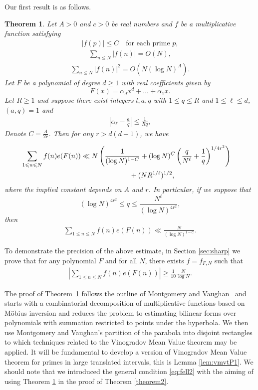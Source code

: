 \documentclass[12pt]{amsart}
\newtheorem{theorem}{Theorem}
\def\\{\cr}
\def\le{\leqslant}
\def\ge{\geqslant}
\begin{document}
Our first result is as follows.
\begin{theorem}
\label{theo:main}
Let $A>0$ and $c>0$ be real numbers and $f$ be a multiplicative function satisfying 
\begin{align}
\label{eq:fprime}
|f(p)| \le C \quad \text{for each prime $p$},
\end{align}
\begin{align}
\label{eq:fell1}
\sum_{n\le N}|f(n)|=O(N),
\end{align}
\begin{align}
\label{eq:fell2}
\sum_{n\le N}|f(n)|^2=O(N(\log{N})^{A}).
\end{align}
Let $F$  be a polynomial of degree $d\ge 1$ with real coefficients given by 
$$F(x)=\alpha_d x^d+\dots+\alpha_1 x.$$
Let $R\ge 1$ and suppose there exist integers $l, a, q$ with $1\le q\le R$ and $1\le \ell \le d$, $(a,q)=1$ and 
\begin{align*}
\left|\alpha_{\ell}-\frac{a}{q}\right|\le \frac{1}{Rq},
\end{align*} 
Denote $C = \frac{A}{2r}$. Then for any $r >d(d+1)$, we have

\begin{align*}
\sum_{1\le n \le N}f(n)e(F(n))&\ll N\left(\frac{1}{(\log{N})^{1-C }}+(\log{N})^{C}\left(\frac{q}{N^{\ell}}+\frac{1}{q}\right)^{1/4r^2}\right) \\ 
& \quad \quad \quad \quad \quad \quad \quad +(NR^{1/\ell})^{1/2},
\end{align*}
where the implied constant depends on $A$ and $r$.
In particular, if we suppose that 
\begin{equation*}
 (\log{N})^{4r^2  } \le q \le \frac{N^{\ell}}{ (\log{N})^{4r^2 } },
 \end{equation*}
 then
\begin{align}
\sum_{1\le n \le N}f(n)e(F(n))\ll \frac{N}{(\log{N})^{1-C}}.  
\end{align}

\end{theorem}
To demonstrate the precision of the above estimate, in Section \ref{sec:sharp} we prove that for any polynomial $F$ and for all $N$,  there exists $f=f_{F,  N}$ such that
\begin{align*}
\left| \sum_{1\le n \le N}f(n)e(F(n)) \right| \ge \frac{1}{10}\frac{N}{\log{N}}.
\end{align*} 



The proof of Theorem~\ref{theo:main} follows the outline of Montgomery and \newline Vaughan~\cite{M-V} and starts with a combinatorial decomposition of multiplicative functions based on M\"{o}bius inversion and reduces the problem to estimating bilinear forms over polynomials with summation restricted to points under the hyperbola. We then use Montgomery and Vaughan's  partition of the parabola into disjoint rectangles to which techniques related to the Vinogradov Mean Value theorem may be applied. It will be fundamental to develop a version of Vinogradov Mean Value theorem for primes in large translated intervals, this is Lemma \ref{lem:vmvtP1}.  We should note that we introduced the general condition \eqref{eq:fell2} with the aiming of using Theorem \ref{theo:main} in the proof of Theorem \ref{theorem2}.
\end{document}
